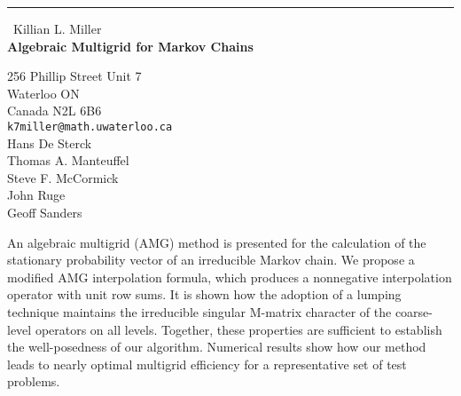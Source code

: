 \documentclass{report}
\begin{document}
\begin{center}
\rule{6in}{1pt} \
{\large Killian L. Miller \\
{\bf Algebraic Multigrid for Markov Chains}}

256 Phillip Street Unit 7 \\ Waterloo ON \\ Canada N2L 6B6
\\
{\tt k7miller@math.uwaterloo.ca}\\
Hans De Sterck\\
Thomas A. Manteuffel\\
Steve F. McCormick\\
John Ruge\\
Geoff Sanders\end{center}

An algebraic multigrid (AMG) method is presented for the calculation of
the stationary probability vector of an irreducible Markov chain. We
propose a modified AMG interpolation formula, which produces a
nonnegative interpolation operator with unit row sums. It is shown how
the adoption of a lumping technique maintains the irreducible singular
M-matrix character of the coarse-level operators on all levels. Together,
these properties are sufficient to establish the well-posedness of our
algorithm. Numerical results show how our method leads to nearly optimal
multigrid efficiency for a representative set of test problems.
\end{document}
